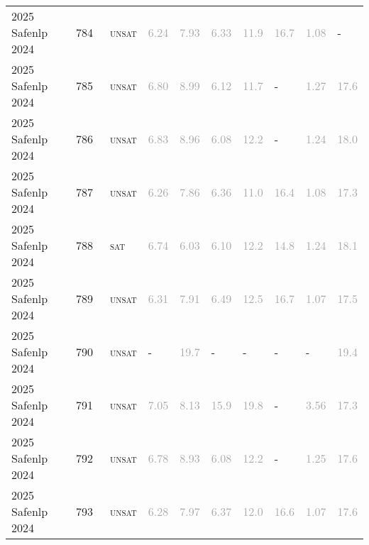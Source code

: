 \begin{center}
{\begin{longtable}{@{}llllllllll@{}}
2025 Safenlp 2024 & 784 & ~\textsc{unsat} & \textcolor{darkgray}{6.24} & \textcolor{darkgray}{7.93} & \textcolor{darkgray}{6.33} & \textcolor{darkgray}{11.9} & \textcolor{darkgray}{16.7} & \textcolor{darkgray}{1.08} & - \\
2025 Safenlp 2024 & 785 & ~\textsc{unsat} & \textcolor{darkgray}{6.80} & \textcolor{darkgray}{8.99} & \textcolor{darkgray}{6.12} & \textcolor{darkgray}{11.7} & - & \textcolor{darkgray}{1.27} & \textcolor{darkgray}{17.6} \\
2025 Safenlp 2024 & 786 & ~\textsc{unsat} & \textcolor{darkgray}{6.83} & \textcolor{darkgray}{8.96} & \textcolor{darkgray}{6.08} & \textcolor{darkgray}{12.2} & - & \textcolor{darkgray}{1.24} & \textcolor{darkgray}{18.0} \\
2025 Safenlp 2024 & 787 & ~\textsc{unsat} & \textcolor{darkgray}{6.26} & \textcolor{darkgray}{7.86} & \textcolor{darkgray}{6.36} & \textcolor{darkgray}{11.0} & \textcolor{darkgray}{16.4} & \textcolor{darkgray}{1.08} & \textcolor{darkgray}{17.3} \\
2025 Safenlp 2024 & 788 & ~\textsc{sat} & \textcolor{darkgray}{6.74} & \textcolor{darkgray}{6.03} & \textcolor{darkgray}{6.10} & \textcolor{darkgray}{12.2} & \textcolor{darkgray}{14.8} & \textcolor{darkgray}{1.24} & \textcolor{darkgray}{18.1} \\
2025 Safenlp 2024 & 789 & ~\textsc{unsat} & \textcolor{darkgray}{6.31} & \textcolor{darkgray}{7.91} & \textcolor{darkgray}{6.49} & \textcolor{darkgray}{12.5} & \textcolor{darkgray}{16.7} & \textcolor{darkgray}{1.07} & \textcolor{darkgray}{17.5} \\
2025 Safenlp 2024 & 790 & ~\textsc{unsat} & - & \textcolor{darkgray}{19.7} & - & - & - & - & \textcolor{darkgray}{19.4} \\
2025 Safenlp 2024 & 791 & ~\textsc{unsat} & \textcolor{darkgray}{7.05} & \textcolor{darkgray}{8.13} & \textcolor{darkgray}{15.9} & \textcolor{darkgray}{19.8} & - & \textcolor{darkgray}{3.56} & \textcolor{darkgray}{17.3} \\
2025 Safenlp 2024 & 792 & ~\textsc{unsat} & \textcolor{darkgray}{6.78} & \textcolor{darkgray}{8.93} & \textcolor{darkgray}{6.08} & \textcolor{darkgray}{12.2} & - & \textcolor{darkgray}{1.25} & \textcolor{darkgray}{17.6} \\
2025 Safenlp 2024 & 793 & ~\textsc{unsat} & \textcolor{darkgray}{6.28} & \textcolor{darkgray}{7.97} & \textcolor{darkgray}{6.37} & \textcolor{darkgray}{12.0} & \textcolor{darkgray}{16.6} & \textcolor{darkgray}{1.07} & \textcolor{darkgray}{17.6} \\

\end{longtable}}
\end{center}
